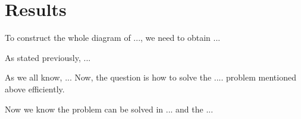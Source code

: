 
\section{Results}

To construct the whole diagram of ..., we need to obtain ...


As stated previously, ...


As we all know, ...
Now, the question is how to solve the .... problem mentioned above efficiently.

\begin{lem}\label{DP_complexity}

\end{lem}


Now we know the problem can be solved in ... and the ...

\newpage
